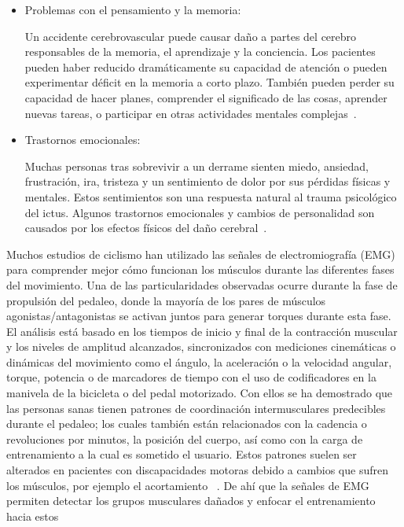 \begin{itemize}
    \item Problemas con el pensamiento y la memoria:
    
    Un accidente cerebrovascular puede causar daño a partes del cerebro responsables de la memoria, el aprendizaje y la conciencia. Los pacientes pueden haber reducido dramáticamente su capacidad de atención o pueden experimentar déficit en la memoria a
    corto plazo. También pueden perder su capacidad de hacer planes, comprender el significado de las cosas, aprender nuevas tareas, o participar en otras actividades mentales complejas~\cite{post-strok}.
    
    \item Trastornos emocionales:
    
    Muchas personas tras sobrevivir a un derrame sienten miedo, ansiedad, frustración, ira, tristeza y un sentimiento de dolor por sus pérdidas físicas y mentales. Estos sentimientos son una respuesta natural al trauma psicológico del ictus. Algunos trastornos emocionales y cambios de personalidad son causados por los efectos físicos del daño cerebral~\cite{post-strok}. 
\end{itemize}

Muchos estudios de ciclismo han utilizado las señales de electromiografía (EMG) para comprender mejor cómo funcionan los músculos durante las diferentes fases del movimiento. Una de las particularidades observadas ocurre durante la fase de propulsión del pedaleo, donde la
mayoría de los pares de músculos agonistas/antagonistas se activan juntos para generar torques durante esta fase. El análisis está basado en los tiempos de inicio y final de la contracción muscular y los niveles de amplitud alcanzados, sincronizados con mediciones cinemáticas o dinámicas del movimiento como el ángulo, la aceleración o la velocidad angular, torque, potencia o de marcadores de tiempo con el uso de codificadores en la manivela de la bicicleta o del pedal motorizado. Con ellos se ha demostrado que las
personas sanas tienen patrones de coordinación intermusculares predecibles durante el pedaleo; los cuales también están relacionados con la cadencia o revoluciones por minutos, la posición del cuerpo, así como con la carga de entrenamiento a la cual es sometido el usuario. Estos patrones suelen ser alterados en pacientes con discapacidades motoras debido a cambios que sufren los músculos, por ejemplo el acortamiento ~\cite{johnston2007biomechanical}. De ahí que la señales de EMG permiten detectar los grupos musculares dañados y enfocar el entrenamiento hacia estos ~\cite{hug2009electromyographic, kautz1998relationships}


